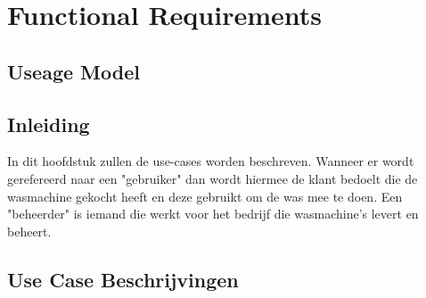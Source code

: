 \chapter{Functional Requirements}
\section{Useage Model}
\newpage
	

\section{Inleiding}
In dit hoofdstuk zullen de use-cases worden beschreven.
Wanneer er wordt gerefereerd naar een "gebruiker" dan wordt hiermee de klant bedoelt die de wasmachine gekocht heeft en deze gebruikt om de was mee te doen.
Een "beheerder" is iemand die werkt voor het bedrijf die wasmachine's levert en beheert.
\newpage
\section{Use Case Beschrijvingen}

